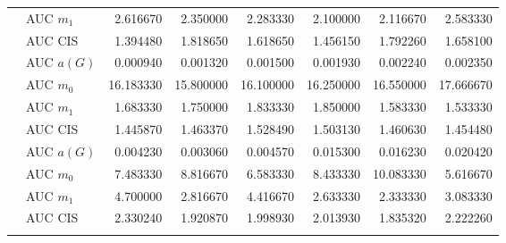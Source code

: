 \begin{table}[htbp]
\begin{tabular}{llrrrrrr}
    & AUC $m_1$ & 2.616670 & 2.350000 & 2.283330 & 2.100000 & 2.116670 & 2.583330 \\
    & AUC CIS & 1.394480 & 1.818650 & 1.618650 & 1.456150 & 1.792260 & 1.658100 \\
    \addlinespace
    \multirow{4}{*}{degree} & AUC $a(G)$ & 0.000940 & 0.001320 & 0.001500 & 0.001930 & 0.002240 & 0.002350 \\
    & AUC $m_0$ & 16.183330 & 15.800000 & 16.100000 & 16.250000 & 16.550000 & 17.666670 \\
    & AUC $m_1$ & 1.683330 & 1.750000 & 1.833330 & 1.850000 & 1.583330 & 1.533330 \\
    & AUC CIS & 1.445870 & 1.463370 & 1.528490 & 1.503130 & 1.460630 & 1.454480 \\
    \addlinespace
    \multirow{4}{*}{random} & AUC $a(G)$ & 0.004230 & 0.003060 & 0.004570 & 0.015300 & 0.016230 & 0.020420 \\
    & AUC $m_0$ & 7.483330 & 8.816670 & 6.583330 & 8.433330 & 10.083330 & 5.616670 \\
    & AUC $m_1$ & 4.700000 & 2.816670 & 4.416670 & 2.633330 & 2.333330 & 3.083330 \\
    & AUC CIS & 2.330240 & 1.920870 & 1.998930 & 2.013930 & 1.835320 & 2.222260 \\
    \addlinespace
    \bottomrule
  \end{tabular}
\end{table}

